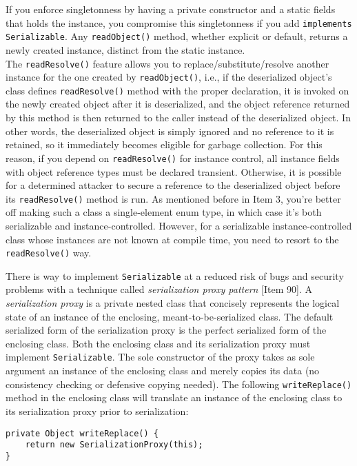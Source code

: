 \documentclass[8pt, table, xcdraw]{article}%
\begin{document}
If you enforce singletonness by having a private constructor and a static fields that holds the instance, you compromise this singletonness if you add \lstinline{implements Serializable}. Any \lstinline{readObject()} method, whether explicit or default, returns a newly created instance, distinct from the static instance.\\
The \lstinline{readResolve()} feature allows you to replace/substitute/resolve another instance for the one created by \lstinline{readObject()}, i.e., if the deserialized object's class defines \lstinline{readResolve()} method with the proper declaration, it is invoked on the newly created object after it is deserialized, and the object reference returned by this method is then returned to the caller instead of the deserialized object. In other words, the deserialized object is simply ignored and no reference to it is retained, so it immediately becomes eligible for garbage collection. For this reason, if you depend on \lstinline{readResolve()} for instance control, all instance fields with object reference types must be declared transient. Otherwise, it is possible for a determined attacker to secure a reference to the deserialized object before its \lstinline{readResolve()} method is run. As mentioned before in Item 3, you're better off making such a class a single-element enum type, in which case it's both serializable and instance-controlled. However, for a serializable instance-controlled class whose instances are not known at compile time, you need to resort to the \lstinline{readResolve()} way.

There is way to implement \lstinline{Serializable} at a reduced risk of bugs and security problems with a technique called \emph{serialization proxy pattern} [Item 90]. A \emph{serialization proxy} is a private nested class that concisely represents the logical state of an instance of the enclosing, meant-to-be-serialized class. The default serialized form of the serialization proxy is the perfect serialized form of the enclosing class. Both the enclosing class and its serialization proxy must implement \lstinline{Serializable}. The sole constructor of the proxy takes as sole argument an instance of the enclosing class and merely copies its data (no consistency checking or defensive copying needed). The following \lstinline{writeReplace()} method in the enclosing class will translate an instance of the enclosing class to its serialization proxy prior to serialization:

\begin{lstlisting}
private Object writeReplace() {
    return new SerializationProxy(this);
}
\end{lstlisting}
\end{document}
